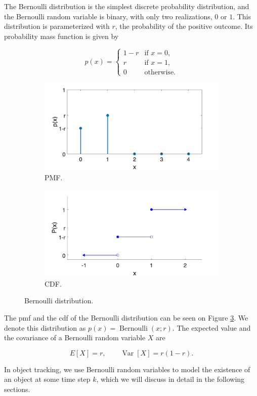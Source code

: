 The Bernoulli distribution is the simplest discrete probability
distribution, and the Bernoulli random variable is binary, with only
two realizations, $0$ or $1$. This distribution is parameterized with 
$r$, the probability of the positive outcome. Its probability mass 
function is given by

\begin{equation}
p(x) = \begin{cases}
 1 - r & \text{if } x = 0, \\
     r & \text{if } x = 1, \\
     0 & \text{otherwise}.
\end{cases}
\end{equation}

\begin{figure}
\centering
\begin{subfigure}{.5\textwidth}
  \centering
  \includegraphics[width=.9\linewidth]{figures/bern.pmf.png}
  \caption{PMF.}
  \label{fig:bern:pmf}
\end{subfigure}\hfill
\begin{subfigure}{.5\textwidth}
  \centering
  \includegraphics[width=.9\linewidth]{figures/bern.cdf.png}
  \caption{CDF.}
  \label{fig:bern:cdf}
\end{subfigure}
\caption[An example of the Bernoulli distribution.]{Bernoulli distribution.}
\label{fig:bern}
\end{figure}

The pmf and the cdf of the Bernoulli distribution can be seen on Figure \ref{fig:bern}.
We denote this distribution as $p(x) = \operatorname{Bernoulli}(x;r)$.
The expected value and the covariance of a Bernoulli random variable $X$ are

\begin{equation}
E[X] = r, \qquad \operatorname{Var}[X] = r(1-r).
\end{equation}

In object tracking, we use Bernoulli random variables to model the existence of
an object at some time step $k$, which we will discuss in detail in the following
sections.
